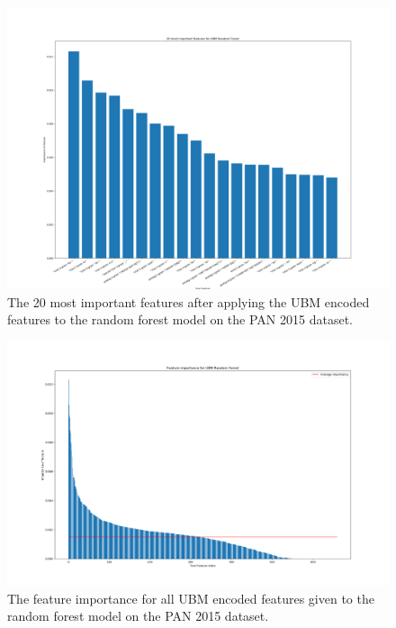 \begin{landscape}
    \begin{figure}
        \centering
        \includegraphics[scale=.34]{./pictures/FeatureImpotrance20.png}
        \caption{The 20 most important features after applying the UBM encoded
        features to the random forest model on the PAN 2015 dataset.}
        \label{fig:feature_importance_small}
    \end{figure}
\end{landscape}

\begin{figure}
    \centering
    \includegraphics[scale=.34]{./pictures/FeatureImpotranceAll.png}
    \caption{The feature importance for all UBM encoded features given
    to the random forest model on the PAN 2015 dataset.}
    \label{fig:feature_importance_all}
\end{figure}


